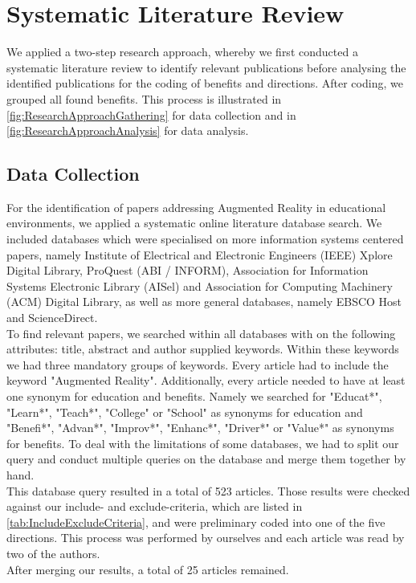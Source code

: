 \section{Systematic Literature Review}
We applied a two-step research approach, whereby we first conducted a systematic literature review to identify relevant publications before analysing the identified publications for the coding of benefits and directions. After coding, we grouped all found benefits. This process is illustrated in \ref{fig:ResearchApproachGathering} for data collection and in \ref{fig:ResearchApproachAnalysis} for data analysis.

\subsection{Data Collection}
For the identification of papers addressing Augmented Reality in educational environments, we applied a systematic online literature database search. We included databases which were specialised on more information systems centered papers, namely Institute of Electrical and Electronic Engineers (IEEE) Xplore Digital Library, ProQuest (ABI / INFORM), Association for Information Systems Electronic Library (AISel) and Association for Computing Machinery (ACM) Digital Library, as well as more general databases, namely EBSCO Host and ScienceDirect.\\
To find relevant papers, we searched within all databases with on the following attributes: title, abstract and author supplied keywords. Within these keywords we had three mandatory groups of keywords. Every article had to include the keyword "Augmented Reality". Additionally, every article needed to have at least one synonym for education and benefits. Namely we searched for "Educat*", "Learn*", "Teach*", "College" or "School" as synonyms for education and "Benefi*", "Advan*", "Improv*", "Enhanc*", "Driver*" or "Value*" as synonyms for benefits. To deal with the limitations of some databases, we had to split our query and conduct multiple queries on the database and merge them together by hand.\\
This database query resulted in a total of 523 articles. Those results were checked against our include- and exclude-criteria, which are listed in \ref{tab:IncludeExcludeCriteria}, and were preliminary coded into one of the five directions. This process was performed by ourselves and each article was read by two of the authors.\\
After merging our results, a total of 25 articles remained.

